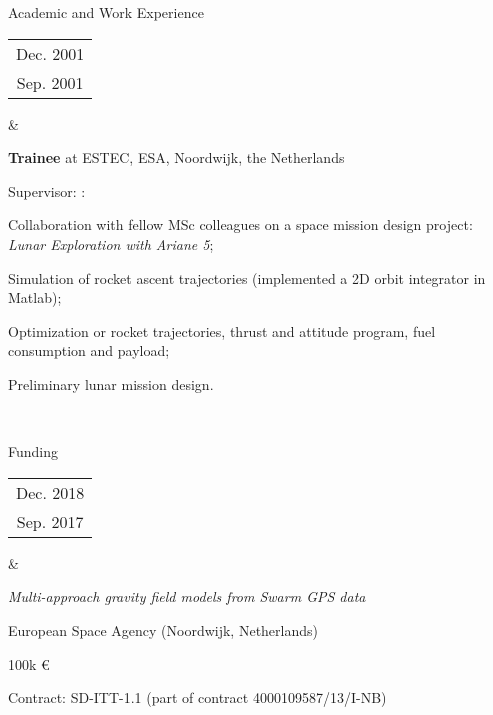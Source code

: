\documentclass[a4paper,9pt]{article}
\newcommand{\dynhref}[2]{%
  \iftoggle{expliciturl}{%
    #2 \footnote{\href{http://#1}{\detokenize{#1}}}%
  }{%
    \href{http://#1}{#2}%
  }%
}
\begin{document}
\begin{cvsection}{Academic and Work Experience}
  \begin{tabular}{c}
  Dec. 2001 \\
  Sep. 2001 \\ 
  \end{tabular} 
  &
  \begin{itti}
    \item \textbf{Trainee} at \acf{ESTEC}, \ac{ESA}, Noordwijk, the Netherlands
    \item Supervisor: \dynhref{en.wikipedia.org/wiki/Wubbo_Ockels}{Prof. Wubbo Ockels}:
    \begin{ittib}
      \item Collaboration with fellow MSc colleagues on a space mission design project: \emph{Lunar Exploration with Ariane 5};
      \item Simulation of rocket ascent trajectories (implemented a 2D orbit integrator in Matlab);
      \item Optimization or rocket trajectories, thrust and attitude program, fuel consumption and payload;
      \item Preliminary lunar mission design.
    \end{ittib}
  \end{itti}\\

\end{cvsection}


\begin{cvsection}{Funding}

  \begin{tabular}{c}
  Dec. 2018 \\
  Sep. 2017 \\ 
  \end{tabular} 
  &
  \begin{itti}
    \item \emph{Multi-approach gravity field models from Swarm GPS data}
    \begin{ittib}
      \item European Space Agency (Noordwijk, Netherlands)
      \item 100k \euro
      \item Contract: SD-ITT-1.1 (part of contract 4000109587/13/I-NB)
    \end{ittib}
  \end{itti}

\end{cvsection}
\end{document}
